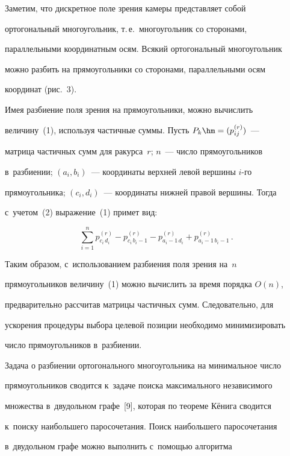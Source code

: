   

  

  Заметим, что дискретное поле зрения камеры представляет собой 

ортогональный многоугольник, т.\,е.\ многоугольник со сторонами, 

параллельными координатным осям. Всякий ортогональный многоугольник 

можно разбить на прямоугольники со сторонами, параллельными осям 

координат (рис.~3).

  

  

  Имея разбиение поля зрения на прямоугольники, можно вычислить 

величину~(1), используя частичные суммы. Пусть $P_k\hm= (p_{ij}^{(r)})$~--- 

матрица частичных сумм для ракурса~$r$; $n$~--- число прямоугольников 

в~разбиении; $(a_i, b_i)$~--- координаты верхней левой вершины $i$-го 

прямоугольника; $(c_i, d_i)$~--- координаты нижней правой вершины. Тогда 

с~учетом~(2) выражение~(1) примет вид:

  $$

  \sum\limits^n_{i=1} p^{(r)}_{c_i\,d_i}-p^{(r)}_{c_i\,b_i-1} - p^{(r)}_{a_i-

1\,d_i}+ p^{(r)}_{a_i-1\,b_i-1}\,.

  $$

Таким образом, с~использованием разбиения поля зрения на~$n$ 

прямоугольников величину~(1) можно вычислить за время порядка $O(n)$, 

предварительно рассчитав матрицы частичных сумм. Следовательно, для 

ускорения процедуры выбора целевой позиции необходимо минимизировать 

число прямоугольников в~разбиении.



  Задача о разбиении ортогонального многоугольника на минимальное число 

прямоугольников сводится к~задаче поиска максимального независимого 

множества в~двудольном графе~[9], которая по теореме Кёнига сводится 

к~поиску наибольшего паросочетания. Поиск наибольшего паросочетания 

в~двудольном графе можно выполнить с~по\-мощью алгоритма  

